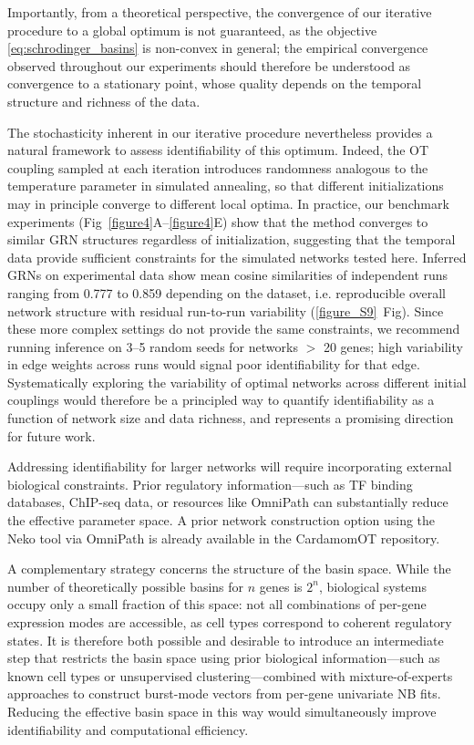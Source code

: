 \documentclass[a4paper, 11pt]{article}
\theoremstyle{plain}
\theoremstyle{remark}
\newcommand*{\firstreview}[1]{{\color{black}#1}}
\begin{document}
Importantly, from a theoretical perspective, the convergence of our 
iterative procedure to a global optimum is not guaranteed, as the 
objective \eqref{eq:schrodinger_basins} is non-convex in general; 
the empirical convergence observed throughout our experiments should 
therefore be understood as convergence to a stationary point, whose 
quality depends on the temporal structure and richness of the data.

The stochasticity inherent in our iterative procedure nevertheless provides a natural framework to assess identifiability of this optimum. Indeed, the OT coupling sampled at each iteration introduces randomness analogous to the temperature parameter in simulated annealing, so that different initializations may in principle converge to different local optima. In practice, our benchmark experiments (Fig~\ref{figure4}A--\ref{figure4}E) show that the method converges to similar GRN structures regardless of initialization, suggesting that the temporal data provide sufficient constraints for the simulated networks tested here. \firstreview{Inferred GRNs on experimental data show mean cosine similarities of independent runs ranging from 0.777 to 0.859 depending on the dataset, i.e. reproducible overall network structure with residual run-to-run variability (\ref{figure_S9}~Fig). Since these more complex
settings do not provide the same constraints, we recommend running inference on 3--5 random
seeds for networks $>$ 20 genes; high variability in edge weights across runs would signal poor
identifiability for that edge.} Systematically exploring the variability of optimal networks across different initial couplings would therefore be a principled way to quantify identifiability as a function of network size and data richness, and represents a promising direction for future work.

Addressing identifiability for larger networks will require incorporating external biological constraints. Prior regulatory information—such as \firstreview{TF} binding databases, ChIP-seq data, or resources like OmniPath \cite{turei2016omnipath} can substantially reduce the effective parameter space. A prior network construction option using the Neko tool \cite{ruscone2025neko} via OmniPath is already available in the CardamomOT repository.

A complementary strategy concerns the structure of the basin space. While the number of theoretically possible basins for $n$ genes is $2^n$, biological systems occupy only a small fraction of this space: not all combinations of per-gene expression modes are accessible, as cell types correspond to coherent regulatory states. It is therefore both possible and desirable to introduce an intermediate step that restricts the basin space using prior biological information—such as known cell types or unsupervised clustering—combined with mixture-of-experts approaches to construct burst-mode vectors from per-gene univariate NB fits. Reducing the effective basin space in this way would simultaneously improve identifiability and computational efficiency.
\end{document}

